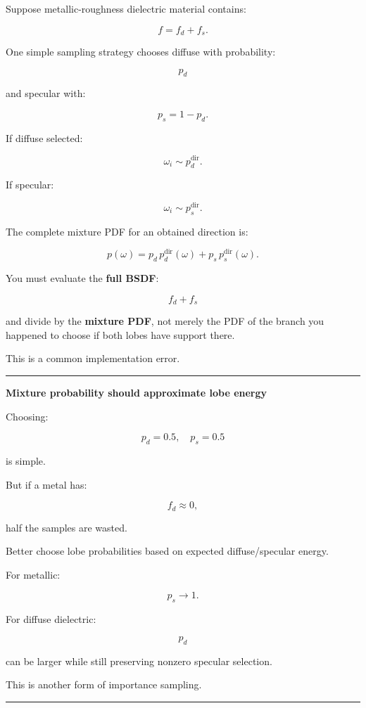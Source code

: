 Suppose metallic-roughness dielectric material contains:

\[
f=
f_d+f_s.
\]

One simple sampling strategy chooses diffuse with probability:

\[
p_d
\]

and specular with:

\[
p_s=1-p_d.
\]

If diffuse selected:

\[
\omega_i\sim p_d^{\text{dir}}.
\]

If specular:

\[
\omega_i\sim p_s^{\text{dir}}.
\]

The complete mixture PDF for an obtained direction is:

\[
\boxed{
p(\omega)
=
p_d\,p_d^{\text{dir}}(\omega)
+
p_s\,p_s^{\text{dir}}(\omega).
}
\]

You must evaluate the \textbf{full BSDF}:

\[
f_d+f_s
\]

and divide by the \textbf{mixture PDF}, not merely the PDF of the branch you happened to choose if both lobes have support there.

This is a common implementation error.

\begin{center}\rule{0.5\linewidth}{0.5pt}\end{center}

\textbf{Mixture probability should approximate lobe energy}

Choosing:

\[
p_d=0.5,
\quad
p_s=0.5
\]

is simple.

But if a metal has:

\[
f_d\approx0,
\]

half the samples are wasted.

Better choose lobe probabilities based on expected diffuse/specular energy.

For metallic:

\[
p_s\rightarrow1.
\]

For diffuse dielectric:

\[
p_d
\]

can be larger while still preserving nonzero specular selection.

This is another form of importance sampling.

\begin{center}\rule{0.5\linewidth}{0.5pt}\end{center}

